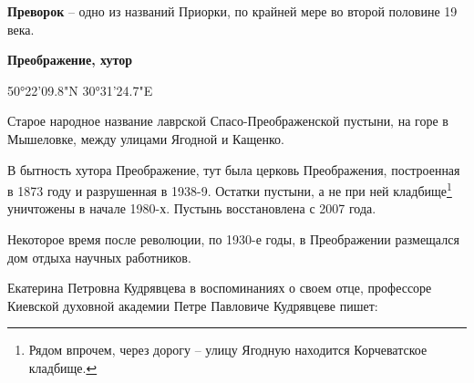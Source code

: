 \medskip


\textbf{Преворок} – одно из названий Приорки, по крайней мере во второй половине 19 века.\\

\medskip


\textbf{Преображение, хутор} 

50°22'09.8"N 30°31'24.7"E

Старое народное название лаврской Спасо-Преображенской пустыни, на горе в Мышеловке, между улицами Ягодной и Кащенко. 

   В бытность хутора Преображение, тут была церковь Преображения, построенная в 1873 году и разрушенная в 1938-9. Остатки пустыни, а не при ней кладбище\footnote{Рядом впрочем, через дорогу – улицу Ягодную находится Корчеватское кладбище.} уничтожены в начале 1980-х. Пустынь восстановлена с 2007 года.

Некоторое время после революции, по 1930-е годы, в Преображении размещался дом отдыха научных работников.

Екатерина Петровна Кудрявцева в воспоминаниях о своем отце, профессоре Киевской духовной академии Петре Павловиче Кудрявцеве пишет:

